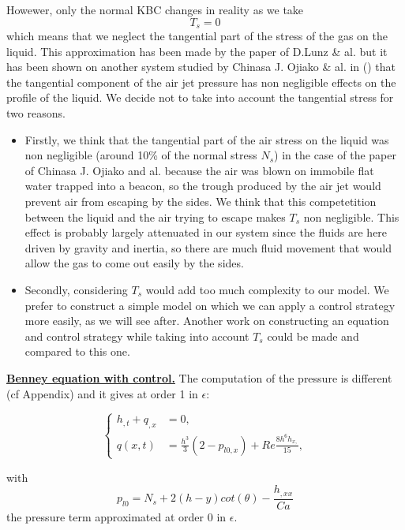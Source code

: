 \documentclass[12pt]{article}
\begin{document}
Howewer, only the normal KBC changes in reality as we take  
\begin{equation}
    \boxed{
T_s=0
    }
\end{equation} 
which means that we neglect the tangential part of the stress of the gas on the liquid.  This approximation has been made by the paper 
of D.Lunz \& al. \cite{Moving_pressure_source} but it has been shown on another system studied by Chinasa J. Ojiako \& al. in
 (\cite{Dewetting_Ojiako}) that the tangential component of the air jet pressure has non negligible effects on the profile of the liquid. 
 We decide not to take into account the tangential stress for two reasons.
\begin{itemize}
    \item Firstly, we think that the tangential part of the air stress on the liquid was non negligible (around 10\% of the normal
     stress $N_s$) in the case of the paper of Chinasa J. Ojiako and al. because the air was blown on immobile flat water trapped into a beacon, so the trough 
     produced by the air jet would prevent air from escaping by the sides. We think that this competetition between the liquid and the 
     air trying to escape makes $T_s$ non negligible. This effect is probably largely attenuated in our system 
     since the fluids are here driven by gravity and inertia, so there are much fluid movement that would allow the gas to come out 
     easily by the sides. 
    \item Secondly, considering $T_s$ would add too much complexity to our model. We prefer to construct a simple model on which
     we can apply a control strategy more easily, as we will see after. Another work on constructing an equation and control strategy while taking into account $T_s$ could be made and compared to this one.
\end{itemize}


\underline{\textbf{Benney equation with control.}}
The computation of the pressure is different (cf Appendix) and it gives at order 1 in $\epsilon$:

\begin{equation}\label{Benney_ctrl_flux}
\boxed{
    \left\{
\begin{aligned}
    h_{,t}+q_{,x} &= 0,\\
    q(x, t) &= \frac{h^3}{3}(2-p_{l0,x})+Re\frac{8h^6h_{x,}}{15},
\end{aligned}
\right.
}
\end{equation}

with 
\begin{equation}
p_{l0}= N_s + 2(h-y)cot(\theta) - \frac{h_{,xx}}{Ca}
\end{equation}
the pressure term approximated at order 0 in $\epsilon$.
\end{document}
